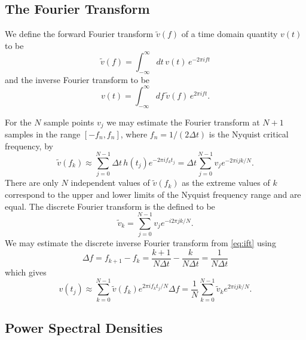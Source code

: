 \subsection{The Fourier Transform}
\label{ss:ftconv}

We define the forward Fourier transform $\tilde{v}(f)$ of a time domain
quantity $v(t)$ to be
\begin{equation}
\label{eq:ft}
\tilde{v}(f)=\int_{-\infty}^\infty dt\,v(t)\, e^{- 2 \pi i f t}
\end{equation}
and the inverse Fourier transform to be 
\begin{equation}
\label{eq:ift}
v(t)=\int_{-\infty}^\infty df\,\tilde{v}(f)\, e^{2 \pi i f t}.
\end{equation}

For the $N$ sample points $v_j$ we may estimate the Fourier transform at 
$N + 1$ samples in the range $[-f_n,f_n]$, where $f_n = 1/(2\Delta t)$ is the
Nyquist critical frequency, by
\begin{equation}
\tilde{v}(f_k) \approx \sum_{j=0}^{N-1} \Delta t\, h(t_j) e^{-2 \pi i f_k t_j}
= \Delta t \sum_{j=0}^{N-1} v_j e^{-2 \pi i j k / N}.
\end{equation}
There are only $N$ independent values of $\tilde{v}(f_k)$ as the extreme
values of $k$ correspond to the upper and lower limits of the Nyquist
frequency range and are equal. The discrete Fourier transform is the defined
to be\cite{T010095}
\begin{equation}
\tilde{v}_k = \sum_{j=0}^{N-1} v_j e^{-i 2 \pi j k / N}.
\end{equation}
We may estimate the discrete inverse Fourier transform from \ref{eq:ift} using
\begin{equation}
\Delta f = f_{k+1} - f_k = \frac{k+1}{N\Delta t} - \frac{k}{N\Delta t} =
\frac{1}{N\Delta t}
\end{equation}
which gives
\begin{equation}
v(t_j) \approx \sum_{k=0}^{N-1} \tilde{v}(f_k) e^{2 \pi i f_k t_j / N} \Delta f
= \frac{1}{N} \sum_{k=0}^{N-1} \tilde{v}_k e^{2 \pi i j k / N}.
\end{equation}

\subsection{Power Spectral Densities}
\label{ss:psdconv}

